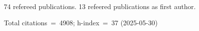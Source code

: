 74 refereed publications. 13 refeered publications as first author.

Total citations~=~4908; h-index~=~37 (2025-05-30)